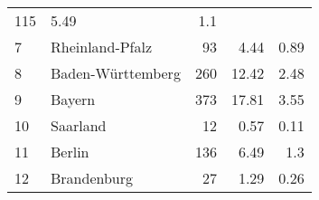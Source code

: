 \begin{longtable}{lXrrr}
       \num{115} &
       \num[round-mode=places,round-precision=2]{5,49} &
         \num[round-mode=places,round-precision=2]{1,1} \\

     7 &
     \multicolumn{1}{X}{ Rheinland-Pfalz   } &


       \num{93} &
       \num[round-mode=places,round-precision=2]{4,44} &
         \num[round-mode=places,round-precision=2]{0,89} \\

     8 &
     \multicolumn{1}{X}{ Baden-Württemberg   } &


       \num{260} &
       \num[round-mode=places,round-precision=2]{12,42} &
         \num[round-mode=places,round-precision=2]{2,48} \\

     9 &
     \multicolumn{1}{X}{ Bayern   } &


       \num{373} &
       \num[round-mode=places,round-precision=2]{17,81} &
         \num[round-mode=places,round-precision=2]{3,55} \\

     10 &
     \multicolumn{1}{X}{ Saarland   } &


       \num{12} &
       \num[round-mode=places,round-precision=2]{0,57} &
         \num[round-mode=places,round-precision=2]{0,11} \\

     11 &
     \multicolumn{1}{X}{ Berlin   } &


       \num{136} &
       \num[round-mode=places,round-precision=2]{6,49} &
         \num[round-mode=places,round-precision=2]{1,3} \\

     12 &
     \multicolumn{1}{X}{ Brandenburg   } &


       \num{27} &
       \num[round-mode=places,round-precision=2]{1,29} &
         \num[round-mode=places,round-precision=2]{0,26} \\


\end{longtable}
